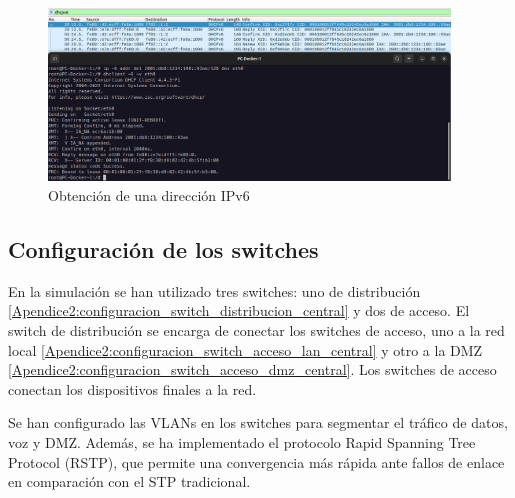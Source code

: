 \begin{figure}[H]
	\centering
	\includegraphics[width=0.95\textwidth]{images/dhclient_ok.png}
	\caption{Obtención de una dirección IPv6}
	\label{fig:dhclient_ok}
\end{figure}


\subsection{Configuración de los switches}
En la simulación se han utilizado tres switches: uno de distribución \ref{Apendice2:configuracion_switch_distribucion_central} y dos de acceso. El switch de distribución se encarga de conectar los switches de acceso, uno a la red local \ref{Apendice2:configuracion_switch_acceso_lan_central} y otro a la DMZ \ref{Apendice2:configuracion_switch_acceso_dmz_central}. Los switches de acceso conectan los dispositivos finales a la red.

\vspace{0.5cm}
Se han configurado las VLANs en los switches para segmentar el tráfico de datos, voz y DMZ. Además, se ha implementado el protocolo Rapid Spanning Tree Protocol (RSTP), que permite una convergencia más rápida ante fallos de enlace en comparación con el STP tradicional.

